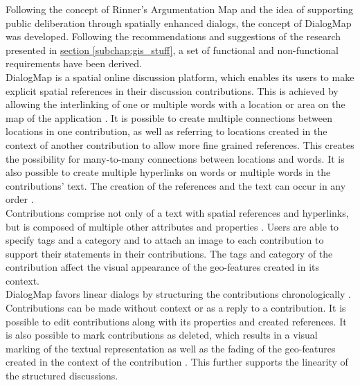 Following the concept of Rinner's Argumentation Map \cite{Rinner_ArgumentationMaps} and the idea of supporting public deliberation through spatially enhanced dialogs, the concept of DialogMap was developed. Following the recommendations and suggestions of the research presented in \hyperref[subchap:gis_stuff]{section \ref{subchap:gis_stuff}}, a set of functional and non-functional requirements have been derived.\\
DialogMap is a spatial online discussion platform, which enables its users to make explicit spatial references in their discussion contributions. This is achieved by allowing the interlinking of one or multiple words with a location or area on the map of the application \cite{Rinner_ArgumentationMaps}. It is possible to create multiple connections between locations in one contribution, as well as referring to locations created in the context of another contribution \cite{Kessler2005_ArgumentationMapPrototype,Voss2004_Evolution_PGIS,you2009_participatory_map_based,Cai2009_spatial_annotation_deliberation} to allow more fine grained references. This creates the possibility for many-to-many connections between locations and words. It is also possible to create multiple hyperlinks on words or multiple words in the contributions' text. The creation of the references and the text can occur in any order \cite{Voss2004_Evolution_PGIS}.\\
Contributions comprise not only of a text with spatial references and hyperlinks, but is composed of multiple other attributes and properties \cite{Longueville2010_community_based_geoportals_web20,Kessler2005_ArgumentationMapPrototype,Kessler2005_Conflict_Resolution}. Users are able to specify tags and a category and to attach an image to each contribution \cite{Tang2005_PPGIS_discussion_forum,zhao2006geodf,you2009_participatory_map_based,Cai2009_spatial_annotation_deliberation} to support their statements in their contributions. The tags and category of the contribution affect the visual appearance of the geo-features created in its context.\\
DialogMap favors linear dialogs by structuring the contributions chronologically \cite{Cherubini2007_shared_maps,you2009_participatory_map_based}. Contributions can be made without context or as a reply to a contribution. It is possible to edit contributions along with its properties and created references. It is also possible to mark contributions as deleted, which results in a visual marking of the textual representation as well as the fading of the geo-features created in the context of the contribution \cite{Hopfer2007_Communication}. This further supports the linearity of the structured discussions.\\
